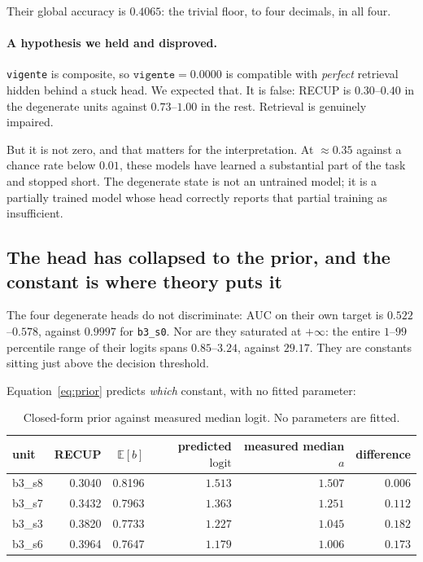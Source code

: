 \documentclass[11pt]{article}
\begin{document}
Their global accuracy is $0.4065$: the trivial floor, to four decimals, in all four.

\paragraph{A hypothesis we held and disproved.} \texttt{vigente} is composite, so
$\texttt{vigente} = 0.0000$ is compatible with \emph{perfect} retrieval hidden behind a stuck head.
We expected that. It is false: RECUP is $0.30$--$0.40$ in the degenerate units against $0.73$--$1.00$
in the rest. Retrieval is genuinely impaired.

But it is not zero, and that matters for the interpretation. At $\approx 0.35$ against a chance rate
below $0.01$, these models have learned a substantial part of the task and stopped short. The
degenerate state is not an untrained model; it is a partially trained model whose head correctly
reports that partial training as insufficient.

\subsection{The head has collapsed to the prior, and the constant is where theory puts it}
\label{sec:prior}

The four degenerate heads do not discriminate: $\mathrm{AUC}$ on their own target is
$0.522$--$0.578$, against $0.9997$ for \texttt{b3\_s0}. Nor are they saturated at $+\infty$: the
entire $1$--$99$ percentile range of their logits spans $0.85$--$3.24$, against $29.17$. They are
constants sitting just above the decision threshold.

Equation~\eqref{eq:prior} predicts \emph{which} constant, with no fitted parameter:

\begin{table}[h]
\centering
\caption{Closed-form prior against measured median logit. No parameters are fitted.}
\begin{tabular}{lrrrrr}
\toprule
unit & RECUP & $\mathbb{E}[b]$ & predicted $\mathrm{logit}$ & measured median $a$ & difference \\
\midrule
b3\_s8 & 0.3040 & 0.8196 & $1.513$ & $1.507$ & $\mathbf{0.006}$ \\
b3\_s7 & 0.3432 & 0.7963 & $1.363$ & $1.251$ & $0.112$ \\
b3\_s3 & 0.3820 & 0.7733 & $1.227$ & $1.045$ & $0.182$ \\
b3\_s6 & 0.3964 & 0.7647 & $1.179$ & $1.006$ & $0.173$ \\
\bottomrule
\end{tabular}
\label{tab:prior}
\end{table}
\end{document}
